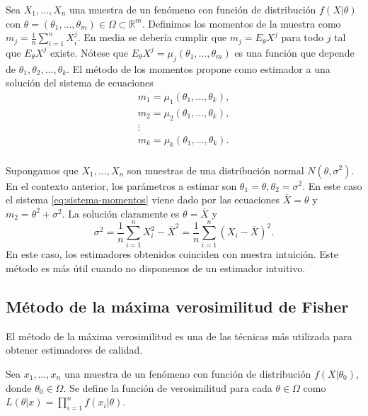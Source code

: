 \documentclass{article}
\begin{document}
Sea $X_1, \ldots, X_n$ una muestra de un fenómeno con función de distribución $f(X |\theta)$ con $\theta = (\theta_1, \ldots, \theta_m) \in \Omega \subset \mathbb{R}^m$. Definimos los momentos de la muestra como $m_j = \frac{1}{n} \sum_{i = 1}^n X_i^j$. En media se debería cumplir que $m_j = E_\theta X^j$ para todo $j$ tal que $E_\theta X^j$ existe. Nótese que $E_\theta X^j = \mu_j(\theta_1, \ldots, \theta_m)$ es una función que depende de $\theta_1, \theta_2, \ldots, \theta_k$. El método de los momentos propone como estimador a una solución del sistema de ecuaciones
\begin{equation} \label{eq:sistema-momentos}
    \begin{matrix}
        m_1 = \mu_1(\theta_1, \ldots, \theta_k), \\
        m_2 = \mu_2(\theta_1, \ldots, \theta_k), \\
        \vdots \\
        m_k = \mu_k(\theta_1, \ldots, \theta_k). \\
    \end{matrix}
\end{equation}

\begin{ex}
    Supongamos que $X_1, \ldots, X_n$ son muestras de una distribución normal $N(\theta, \sigma^2)$. En el contexto anterior, los parámetros a estimar son $\theta_1 = \theta, \theta_2 = \sigma^2$. En este caso el sistema \eqref{eq:sistema-momentos} viene dado por las ecuaciones $\overline{X} = \theta$ y $m_2 = \theta^2 + \sigma^2$. La solución claramente es $\theta = \overline{X}$ y
    \[\sigma^2 = \frac{1}{n} \sum_{i = 1}^n X_i^2 - \overline{X}^2 = \frac{1}{n} \sum_{i = 1}^n (X_i - \overline{X})^2.\]
    En este caso, los estimadores obtenidos coinciden con nuestra intuición. Este método es más útil cuando no disponemos de un estimador intuitivo.
\end{ex}

\subsection{Método de la máxima verosimilitud de Fisher}

    El método de la máxima verosimilitud es una de las técnicas más utilizada para obtener estimadores de calidad.

    \begin{definition}
        Sea $x_1, \ldots, x_n$ una muestra de un fenómeno con función de distribución $f(X | \theta_0)$, donde $\theta_0 \in \Omega$. Se define la función de verosimilitud para cada $\theta \in \Omega$ como $L(\theta | x) = \prod_{i = 1}^n f(x_i| \theta)$.
    \end{definition}
\end{document}
